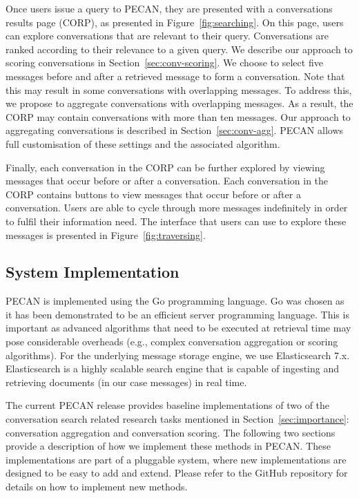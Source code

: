 Once users issue a query to PECAN, they are presented with a conversations results page (CORP), as presented in Figure~\ref{fig:searching}. On this page, users can explore conversations that are relevant to their query. Conversations are ranked according to their relevance to a given query. We describe our approach to scoring conversations in Section~\ref{sec:conv-scoring}. We choose to select five messages before and after a retrieved message to form a conversation. Note that this may result in some conversations with overlapping messages. To address this, we propose to aggregate conversations with overlapping messages. As a result, the CORP may contain conversations with more than ten messages. Our approach to aggregating conversations is described in Section~\ref{sec:conv-agg}. PECAN allows full customisation of these settings and the associated algorithm. 

Finally, each conversation in the CORP can be further explored by viewing messages that occur before or after a conversation. Each conversation in the CORP contains buttons to view messages that occur before or after a conversation. Users are able to cycle through more messages indefinitely in order to fulfil their information need. The interface that users can use to explore these messages is presented in Figure~\ref{fig:traversing}.


\subsection{System Implementation}

PECAN is implemented using the Go programming language. Go was chosen as it has been demonstrated to be an efficient server programming language. This is important as advanced algorithms that need to be executed at retrieval time may pose considerable overheads (e.g., complex conversation aggregation or scoring algorithms). For the underlying message storage engine, we use Elasticsearch 7.x. Elasticsearch is a highly scalable search engine that is capable of ingesting and retrieving documents (in our case messages) in real time.

The current PECAN release provides baseline implementations of two of the conversation search related research tasks mentioned in Section~\ref{sec:importance}: conversation aggregation and conversation scoring. The following two sections provide a description of how we implement these methods in PECAN. These implementations are part of a pluggable system, where new implementations are designed to be easy to add and extend. Please refer to the GitHub repository for details on how to implement new methods.

